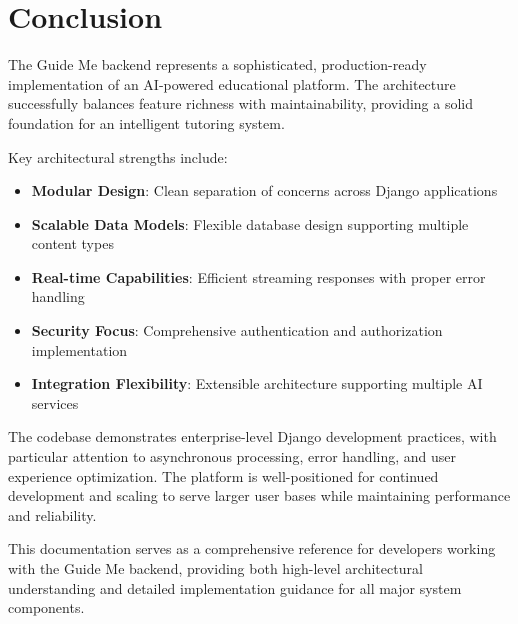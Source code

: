 \documentclass[12pt,a4paper]{article}
\begin{document}
\section{Conclusion}

The Guide Me backend represents a sophisticated, production-ready implementation of an AI-powered educational platform. The architecture successfully balances feature richness with maintainability, providing a solid foundation for an intelligent tutoring system.

Key architectural strengths include:

\begin{itemize}
    \item \textbf{Modular Design}: Clean separation of concerns across Django applications
    \item \textbf{Scalable Data Models}: Flexible database design supporting multiple content types
    \item \textbf{Real-time Capabilities}: Efficient streaming responses with proper error handling
    \item \textbf{Security Focus}: Comprehensive authentication and authorization implementation
    \item \textbf{Integration Flexibility}: Extensible architecture supporting multiple AI services
\end{itemize}

The codebase demonstrates enterprise-level Django development practices, with particular attention to asynchronous processing, error handling, and user experience optimization. The platform is well-positioned for continued development and scaling to serve larger user bases while maintaining performance and reliability.

This documentation serves as a comprehensive reference for developers working with the Guide Me backend, providing both high-level architectural understanding and detailed implementation guidance for all major system components.
\end{document}
